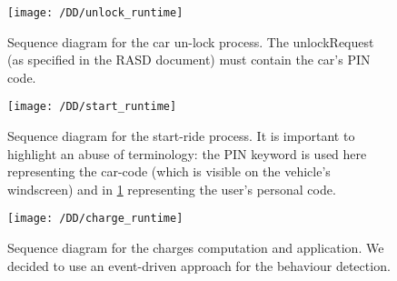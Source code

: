 \newpage
\begin{figure}[!ht]
  \centering
  \vspace{0.2cm}
  \texttt{[image: /DD/unlock\_runtime]}\\
  \vspace{0.4cm}
  \caption{Sequence diagram for the car un-lock process. The unlockRequest (as specified in the RASD document) must contain the car's PIN code.} 
  \label{fig:unlock_runtime} 
\end{figure}
\newpage
\begin{figure}[!ht]
  \centering
  \vspace{0.2cm}
  \texttt{[image: /DD/start\_runtime]}\\
  \vspace{0.4cm}
  \caption{Sequence diagram for the start-ride process. It is important to highlight an abuse of terminology: the PIN keyword is used here representing the car-code (which is visible on the vehicle's windscreen) and in \ref{fig:unlock_runtime} representing the user's personal code.}
  \label{fig:start_runtime} 
\end{figure}
\newpage
\begin{figure}[!ht]
  \centering
  \vspace{0.2cm}
  \texttt{[image: /DD/charge\_runtime]}\\
  \vspace{0.4cm}
  \caption{Sequence diagram for the charges computation and application. We decided to use an event-driven approach for the behaviour detection.} 
  \label{fig:charge_runtime} 
\end{figure}
\newpage